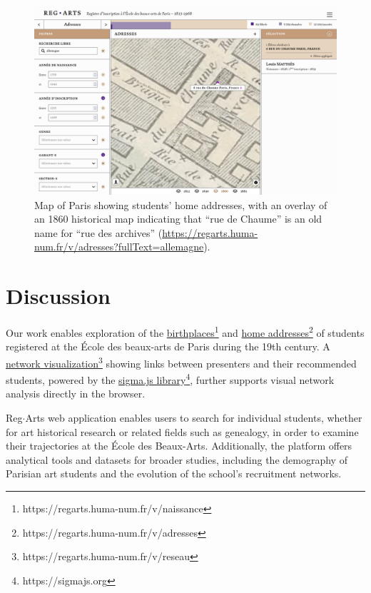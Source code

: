 \documentclass[final]{anthology-ch} %
\begin{document}
\begin{figure}[t!]
  \centering
  \includegraphics[width=1\linewidth]{figures/paris_map_chaume.png}
  \caption{Map of Paris showing students’ home addresses, with an overlay of an 1860 historical map indicating that “rue de Chaume” is an old name for “rue des archives” (\href{https://regarts.huma-num.fr/v/adresses?fullText=allemagne}{https://regarts.huma-num.fr/v/adresses?fullText=allemagne}).}
  \label{fig:home_map}
\end{figure}

\section{Discussion}
Our work enables exploration of the \href{https://regarts.huma-num.fr/v/naissance}{birthplaces}\footnote{https://regarts.huma-num.fr/v/naissance} and \href{https://regarts.huma-num.fr/v/adresses}{home addresses}\footnote{https://regarts.huma-num.fr/v/adresses} of students registered at the École des beaux-arts de Paris during the 19th century. A \href{https://regarts.huma-num.fr/v/reseau}{network visualization}\footnote{https://regarts.huma-num.fr/v/reseau} showing links between presenters and their recommended students, powered by the \href{https://sigmajs.org}{sigma.js library}\footnote{https://sigmajs.org}, further supports visual network analysis directly in the browser. 

Reg$\cdot$Arts web application enables users to search for individual students, whether for art historical research or related fields such as genealogy, in order to examine their trajectories at the École des Beaux-Arts. Additionally, the platform offers analytical tools and datasets for broader studies, including the demography of Parisian art students and the evolution of the school’s recruitment networks. 
\end{document}
